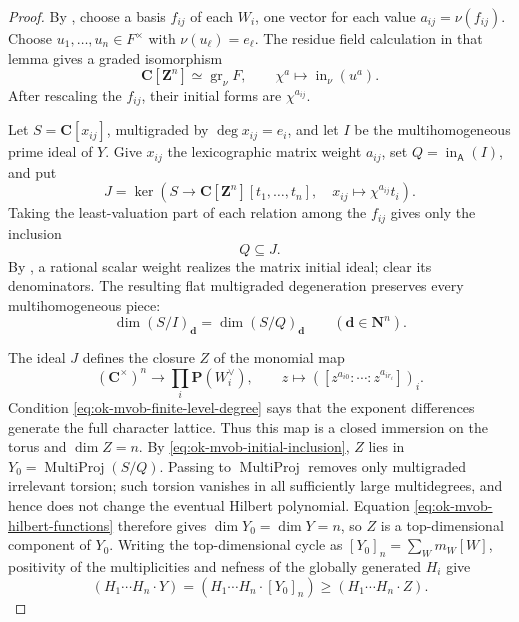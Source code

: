 \begin{proof}
By , choose a basis \(f_{ij}\) of each
\(W_i\), one vector for each value \(a_{ij}=\nu(f_{ij})\).  Choose
\(u_1,\ldots,u_n\in F^\times\) with \(\nu(u_\ell)=e_\ell\).  The residue
field calculation in that lemma gives a graded isomorphism
\[
 \mathbf C[\mathbf Z^n]\simeq\operatorname{gr}_\nu F,
 \qquad \chi^a\longmapsto\operatorname{in}_\nu(u^a).
\]
After rescaling the \(f_{ij}\), their initial forms are \(\chi^{a_{ij}}\).

Let \(S=\mathbf C[x_{ij}]\), multigraded by \(\deg x_{ij}=e_i\), and let
\(I\) be the multihomogeneous prime ideal of \(Y\).  Give \(x_{ij}\) the
lexicographic matrix weight \(a_{ij}\), set
\(Q=\operatorname{in}_{\mathsf A}(I)\), and put
\[
 J=\ker\!\left(S\longrightarrow
 \mathbf C[\mathbf Z^n][t_1,\ldots,t_n],\quad
 x_{ij}\longmapsto\chi^{a_{ij}}t_i\right).
\]
Taking the least-valuation part of each relation among the \(f_{ij}\) gives
only the inclusion
\[
                              Q\subseteq J.
\tag{55.33}\label{eq:ok-mvob-initial-inclusion}
\]
By \cite[Proposition~8.10]{KM19}, a rational scalar weight realizes the
matrix initial ideal; clear its denominators.  The resulting flat
multigraded degeneration preserves every multihomogeneous piece:
\[
 \dim(S/I)_{\mathbf d}=\dim(S/Q)_{\mathbf d}
 \qquad(\mathbf d\in\mathbf N^n).
\tag{55.34}\label{eq:ok-mvob-hilbert-functions}
\]

The ideal \(J\) defines the closure \(Z\) of the monomial map
\[
 (\mathbf C^\times)^n\longrightarrow
 \prod_i\mathbf P(W_i^\vee),\qquad
 z\longmapsto([z^{a_{i0}}:\cdots:z^{a_{ir_i}}])_i.
\]
Condition \eqref{eq:ok-mvob-finite-level-degree} says that the exponent
differences generate the full character lattice.  Thus this map is a
closed immersion on the torus and \(\dim Z=n\).  By
\eqref{eq:ok-mvob-initial-inclusion}, \(Z\) lies in
\(Y_0=\operatorname{MultiProj}(S/Q)\).  Passing to
\(\operatorname{MultiProj}\) removes only multigraded irrelevant torsion;
such torsion vanishes in all sufficiently large multidegrees, and hence
does not change the eventual Hilbert polynomial.  Equation
\eqref{eq:ok-mvob-hilbert-functions} therefore gives
\(\dim Y_0=\dim Y=n\), so \(Z\) is a top-dimensional component of \(Y_0\).
Writing the top-dimensional cycle as
\([Y_0]_n=\sum_Wm_W[W]\), positivity of the multiplicities and nefness of
the globally generated \(H_i\) give
\[
 (H_1\cdots H_n\cdot Y)
 =(H_1\cdots H_n\cdot[Y_0]_n)
 \geq(H_1\cdots H_n\cdot Z).
\tag{55.35}\label{eq:ok-mvob-toric-component}
\]


\end{proof}
